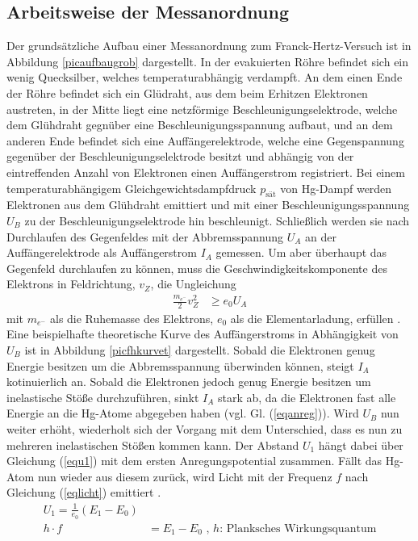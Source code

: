 \subsection{Arbeitsweise der Messanordnung} \label{theorie}
 
Der grundsätzliche Aufbau einer Messanordnung zum Franck-Hertz-Versuch ist in Abbildung \ref{picaufbaugrob}
dargestellt. 
In der evakuierten Röhre befindet sich ein wenig Quecksilber, welches temperaturabhängig verdampft.
An dem einen Ende der Röhre befindet sich ein Glüdraht, aus dem beim Erhitzen Elektronen austreten, 
in der Mitte liegt eine netzförmige Beschleunigungselektrode, welche dem Glühdraht gegnüber eine
Beschleunigungsspannung aufbaut, und an dem anderen Ende befindet sich eine Auffängerelektrode,
welche eine Gegenspannung gegenüber der Beschleunigungselektrode besitzt und abhängig von der
eintreffenden Anzahl von Elektronen einen Auffängerstrom registriert.
Bei einem temperaturabhängigem Gleichgewichtsdampfdruck $p_{\text{sät}}$ von Hg-Dampf 
werden Elektronen aus dem Glühdraht emittiert und mit einer Beschleunigungsspannung $U_B$ zu der
Beschleunigungselektrode hin beschleunigt. Schließlich werden sie nach Durchlaufen des 
Gegenfeldes mit der Abbremsspannung $U_A$ an der Auffängerelektrode als Auffängerstrom $I_A$
gemessen. Um aber überhaupt das Gegenfeld durchlaufen zu können, muss die Geschwindigkeitskomponente
des Elektrons in Feldrichtung, $v_Z$, die Ungleichung
\begin{align}
\frac{m_{e^-}}{2} v_Z^2 &\geq e_0 U_A 
\end{align}
mit $m_{e^-}$ als die Ruhemasse des Elektrons, $e_0$ als die Elementarladung, erfüllen \cite{anleitung}.\\
Eine beispielhafte theoretische Kurve des Auffängerstroms in Abhängigkeit von $U_B$ ist in
Abbildung \ref{picfhkurvet} dargestellt. Sobald die Elektronen genug Energie besitzen um die 
Abbremsspannung überwinden können, steigt $I_A$ kotinuierlich an. Sobald die Elektronen jedoch
genug Energie besitzen um inelastische Stöße durchzuführen, sinkt $I_A$ stark ab, da die Elektronen
fast alle Energie an die Hg-Atome abgegeben haben (vgl. Gl. (\ref{eqanreg})). Wird $U_B$ nun weiter
erhöht, wiederholt sich der Vorgang mit dem Unterschied, dass es nun zu mehreren inelastischen Stößen 
kommen kann. Der Abstand $U_1$ hängt dabei über Gleichung (\ref{equ1}) mit dem ersten Anregungspotential 
zusammen. Fällt das Hg-Atom nun wieder aus diesem zurück, wird Licht mit der Frequenz $f$ nach Gleichung
(\ref{eqlicht}) emittiert \cite {anleitung}.
\begin{align}
U_1=\frac{1}{e_0}(E_1-E_0) \label{equ1} \\
h\cdot f &= E_1-E_0 \text{ , $h$: Planksches Wirkungsquantum} \label{eqlicht}
\end{align}
